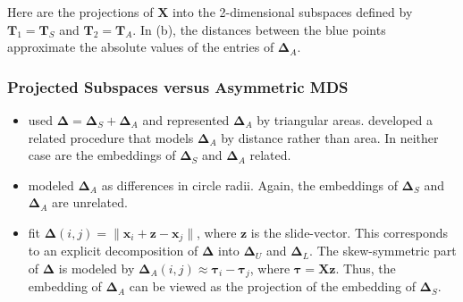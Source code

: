 \documentclass[professionalfonts, hyperref={pdfpagelabels=false,
  colorlinks=true, linkcolor=purple}]{beamer}
\begin{document}
\begin{frame}
  \label{morsecode:fig}
  Here are the projections of $\mathbf{X}$ into the 2-dimensional
  subspaces defined by $\mathbf{T}_1 = \mathbf{T}_S$ and $\mathbf{T}_2
  = \mathbf{T}_A$. In (b), the distances between the blue points
  approximate the absolute values of the entries of $\bm{\Delta}_A$. 
\begin{figure}[htbp]
  \centering {} 
  \label{fig:morsecode}
\end{figure}
\end{frame}

\begin{frame}
  \frametitle{Projected Subspaces versus Asymmetric MDS}
  \begin{itemize}
  \item \cite{gower77:_recen} used $\bm{\Delta} = \bm{\Delta}_S +
    \bm{\Delta}_A$ and represented $\bm{\Delta}_A$ by triangular
    areas. \cite{borg05:_moder} developed a related procedure that
    models $\bm{\Delta}_A$ by distance rather than area. In neither
    case are the embeddings of $\bm{\Delta}_S$ and $\bm{\Delta}_A$
    related. \vskip10pt
  \item \cite{okada87:_geomet} modeled $\bm{\Delta}_A$ as differences
    in circle radii. Again, the embeddings of $\bm{\Delta}_S$ and
    $\bm{\Delta}_A$ are unrelated. \vskip10pt 
  \item \cite{zielmand93:_analy} fit $\bm{\Delta}(i,j) =
    \|\mathbf{x}_i + \mathbf{z} - \mathbf{x}_j\|$, where $\mathbf{z}$
    is the slide-vector. This corresponds to an explicit decomposition
    of $\bm{\Delta}$ into $\bm{\Delta}_U$ and $\bm{\Delta}_L$. The
    skew-symmetric part of $\bm{\Delta}$ is modeled by
    $\bm{\Delta}_A(i,j) \approx \bm{\tau}_i - \bm{\tau}_j$,
    where $\bm{\tau} = \mathbf{X}\mathbf{z}$. Thus, the embedding
    of $\bm{\Delta}_A$ can be viewed as the projection of the
    embedding of $\bm{\Delta}_S$. 
  \end{itemize}
\end{frame}
\end{document}
